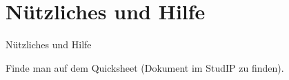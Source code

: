 \documentclass[hyperref={xetex}]{beamer}
\begin{document}
\section{Nützliches und Hilfe}
\begin{frame}[fragile]{Nützliches und Hilfe}
\begin{center}
Finde man auf dem \alert{Quicksheet} (Dokument im StudIP zu finden).
\end{center}
\end{frame}
%
%
\end{document}
